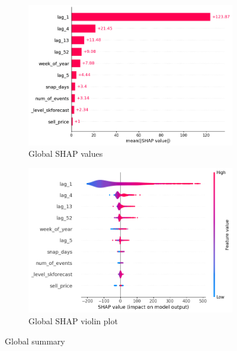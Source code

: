 \begin{figure}[h]
    \centering
    \begin{minipage}{.45\textwidth}
        \centering
        \begin{subfigure}{\textwidth}
            \centering
            \includegraphics[width=\linewidth]{sections/img/shap_global}
            \caption{Global SHAP values}
            \label{fig:global_shap}
        \end{subfigure}%
        \begin{subfigure}{\textwidth}
            \centering
            \includegraphics[width=\linewidth]{sections/img/shap_global_vioalin}
            \caption{Global SHAP violin plot}
            \label{fig:global_shap_violin}
        \end{subfigure}%
    \end{minipage}%
    \hfill
    \begin{minipage}{.45\textwidth}
        \centering
    \end{minipage}
    \caption{Global summary}\label{fig:global_summary}
\end{figure}


